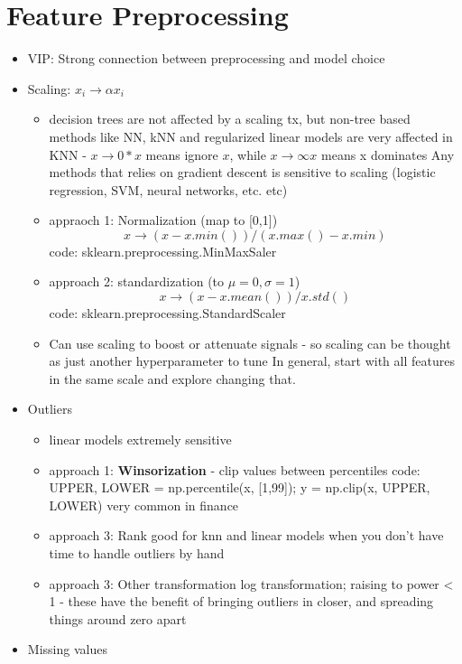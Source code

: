 \documentclass[a4paper]{report}
\newcommand{\brown}{\color{brown}}
\begin{document}
\section{Feature Preprocessing}
\begin{itemize}
  \item VIP: Strong connection between preprocessing and model choice
  \item Scaling: $ x_i \to \alpha x_i$
    \begin{itemize}
      \item decision trees are not affected by a scaling tx, but non-tree based methods like NN, kNN and regularized linear models are very affected
	\subitem in KNN - $x \to 0*x$ means ignore $x$, while $x \to \infty x$ means x dominates
	\subitem Any methods that relies on gradient descent is sensitive to scaling (logistic regression, SVM, neural networks, etc. etc)
      \item appraoch 1: Normalization (map to [0,1])
	$$ x \to (x - x.min())/(x.max() - x.min) $$
        \subitem code: {\color{brown} sklearn.preprocessing.MinMaxSaler}
      \item approach 2: standardization (to $\mu=0, \sigma=1$)
	$$ x \to (x - x.mean())/x.std()$$
	\subitem code: {\brown sklearn.preprocessing.StandardScaler} 
      \item Can use scaling to boost or attenuate signals - so scaling can be thought as just another hyperparameter to tune
	\subitem In general, start with all features in the same scale and explore changing that.
    \end{itemize}
  \item Outliers
    \begin{itemize}
      \item linear models extremely sensitive
      \item approach 1: {\bf Winsorization} - clip values between percentiles
	\subitem code: {\brown UPPER, LOWER = np.percentile(x, [1,99]); y = np.clip(x, UPPER, LOWER)}
	\subitem very common in finance
      \item approach 3: Rank
	\subitem good for knn and linear models when you don't have time to handle outliers by hand
      \item approach 3: Other transformation
	\subitem log transformation; raising to power < 1 - these have the benefit of bringing outliers in closer, and spreading things around zero apart
    \end{itemize}
  \item Missing values
    \begin{itemize}

\end{itemize}
\end{itemize}
\end{document}
